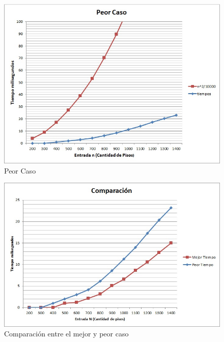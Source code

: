 \begin{figure}[H]
  \begin{center}
      \includegraphics[scale=0.70]{imagenes/PeorCasoEj1.jpg}
	  \end{center}
 \caption{Peor Caso}
\end{figure}



\vspace*{0.3cm}








\begin{figure}[H]
  \begin{center}
      \includegraphics[scale=0.70]{imagenes/ComparacionEj1.jpg}
	  \end{center}
 \caption{Comparación entre el mejor y peor caso}
\end{figure}

